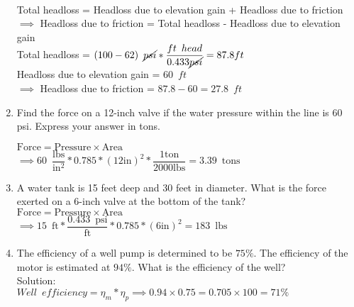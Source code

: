 \begin{enumerate}[1.]
\\
\vspace{0.2cm}
Total headloss = Headloss due to elevation gain + Headloss due to friction\\
\vspace{0.2cm}
$\implies$ Headloss due to friction = Total headloss - Headloss due to elevation gain\\
\vspace{0.2cm}
Total headloss = $(100 - 62)\enspace \cancel{psi}* \dfrac{ft \enspace head}{0.433\cancel{psi}}=87.8 ft $\\
Headloss due to elevation gain = $60 \enspace ft $\\
$\implies$ Headloss due to friction = $87.8-60=\boxed{27.8 \enspace ft}$\\
\vspace{0.2cm}
 \item Find the force on a 12-inch valve if the water pressure within the line is 60 psi. Express your answer in tons.

$\textrm{Force}= \textrm{Pressure} \times \textrm{Area}$\\
\vspace{0.3cm}
$\implies 60 \enspace \dfrac{\mathrm{lbs}}{\mathrm{in^2}}*0.785 *(12 \mathrm{in})^2*\dfrac{1 \mathrm{ton}}{2000 \mathrm{lbs}} =\boxed{3.39 \enspace\mathrm{tons}}$
\vspace{0.3cm}

\item A water tank is 15 feet deep and 30 feet in diameter. What is the force exerted on a 6-inch valve at the bottom of the tank?\\
\vspace{0.5cm}
$\textrm{Force}= \textrm{Pressure} \times \textrm{Area}$\\
\vspace{0.5cm}
$\implies 15 \enspace\mathrm{ft}* \dfrac{0.433 \enspace \mathrm{psi}}{\mathrm{ft}}*0.785 *(6 \mathrm{in})^2 =\boxed{183 \enspace\mathrm{lbs}}$\\


\item The efficiency of a well pump is determined to be $75 \%$. The efficiency of the motor is estimated at $94 \%$. What is the efficiency of the well?\\
 \vspace{0.2cm}
Solution:\\ 
 \vspace{0.2cm}
$Well \enspace efficiency=\eta_m * \eta_p \implies 0.94 \times 0.75=0.705 \times 100=\boxed{71 \%}$
 \vspace{0.2cm}


\end{enumerate}
